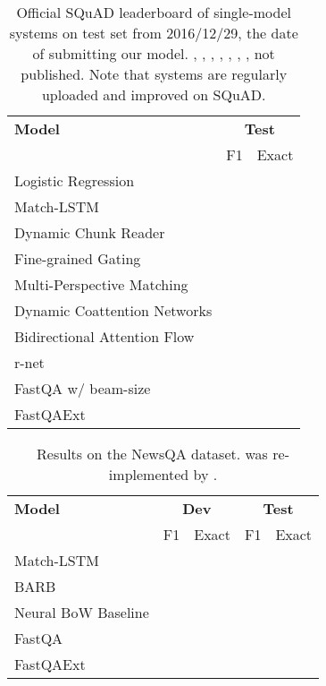 \documentclass[11pt,a4paper]{article}
\begin{document}
\begin{table}[t]
    \centering
    \small
        \begin{tabular}{l c c}
        \toprule
        \textbf{Model} & \multicolumn{2}{c}{\textbf{Test}} \\
        & F1 & Exact \\
        \midrule
        Logistic Regression &  &   \\
        Match-LSTM &  &  \\ 
        Dynamic Chunk Reader &  &  \\
        Fine-grained Gating &  &  \\
        Multi-Perspective Matching &  &  \\
        Dynamic Coattention Networks &  &  \\
        Bidirectional Attention Flow &  &  \\
        r-net &  &  \\
        \midrule
        FastQA w/ beam-size  &  &  \\
        FastQAExt  &  &  \\
        \bottomrule
    \end{tabular}
    \caption{Official SQuAD leaderboard of single-model systems on test set from 2016/12/29, the date of submitting our model. , , , , , , ,  not published. Note that systems are regularly uploaded and improved on SQuAD.}
    \label{tab:squad_test_results}
\end{table}


\begin{table}[t]
    \centering
    \small
    \begin{tabular}{l c c c c}
        \toprule
        \textbf{Model} & \multicolumn{2}{c}{\textbf{Dev}} & \multicolumn{2}{c}{\textbf{Test}} \\
        & F1 & Exact & F1 & Exact \\
        \midrule
        Match-LSTM &  &  &  &  \\
        BARB &  &  &  &  \\
        \midrule
        Neural BoW Baseline &  &  &  &  \\
        FastQA  &  &  &  &  \\
        FastQAExt  &  &  &  &  \\
        \bottomrule
    \end{tabular}
    \caption{Results on the NewsQA dataset.  was re-implemented by .}
    \label{tab:news_qa_results}
\end{table}
\end{document}
